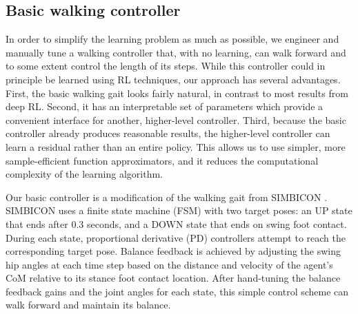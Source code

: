 \documentclass[a4paper]{article}
\begin{document}
\subsection{Basic walking controller}

In order to simplify the learning problem as much as possible, we engineer and manually tune a walking controller that, with no learning, can walk forward and to some extent control the length of its steps.
While this controller could in principle be learned using RL techniques, our approach has several advantages.
First, the basic walking gait looks fairly natural, in contrast to most results from deep RL.
Second, it has an interpretable set of parameters which provide a convenient interface for another, higher-level controller.
Third, because the basic controller already produces reasonable results, the higher-level controller can learn a residual rather than an entire policy.
This allows us to use simpler, more sample-efficient function approximators, and it reduces the computational complexity of the learning algorithm.

Our basic controller is a modification of the walking gait from SIMBICON \citep{yin2007simbicon}.
SIMBICON uses a finite state machine (FSM) with two target poses: an UP state that ends after 0.3 seconds, and a DOWN state that ends on swing foot contact.
During each state, proportional derivative (PD) controllers attempt to reach the corresponding target pose.
Balance feedback is achieved by adjusting the swing hip angles at each time step based on the distance and velocity of the agent's CoM relative to its stance foot contact location.
After hand-tuning the balance feedback gains and the joint angles for each state, this simple control scheme can walk forward and maintain its balance.
\end{document}

